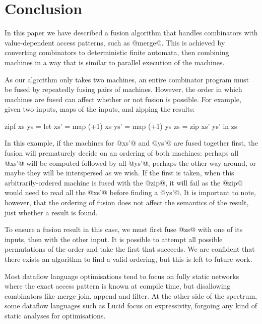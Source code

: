 \section{Conclusion}
\label{s:Conclusion}

In this paper we have described a fusion algorithm that handles combinators with value-dependent access patterns, such as @merge@.
This is achieved by converting combinators to deterministic finite automata, then combining machines in a way that is similar to parallel execution of the machines.

As our algorithm only takes two machines, an entire combinator program must be fused by repeatedly fusing pairs of machines.
However, the order in which machines are fused can affect whether or not fusion is possible.
For example, given two inputs, maps of the inputs, and zipping the results:

\begin{code}
zipf xs ys
 = let xs' = map (+1) xs
       ys' = map (+1) ys
       zs  = zip xs' ys'
   in  zs
\end{code}

In this example, if the machines for @xs'@ and @ys'@ are fused together first, the fusion will prematurely decide on an ordering of both machines: perhaps all @xs'@ will be computed followed by all @ys'@, perhaps the other way around, or maybe they will be interspersed as we wish.
If the first is taken, when this arbitrarily-ordered machine is fused with the @zip@, it will fail as the @zip@ would need to read all the @xs'@ before finding a @ys'@.
It is important to note, however, that the ordering of fusion does not affect the semantics of the result, just whether a result is found.

To ensure a fusion result in this case, we must first fuse @zs@ with one of its inputs, then with the other input.
It is possible to attempt all possible permutations of the order and take the first that succeeds.
We are confident that there exists an algorithm to find a valid ordering, but this is left to future work.


Most dataflow language optimisations tend to focus on fully static networks where the exact access pattern is known at compile time\cite{thies2002streamit}, but disallowing combinators like merge join, append and filter.
At the other side of the spectrum, some dataflow languages such as Lucid\cite{stephens1997survey} focus on expressivity, forgoing any kind of static analyses for optimisations.

